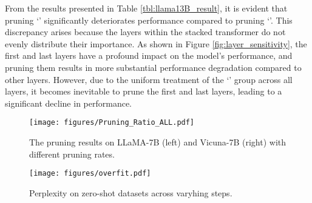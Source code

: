 From the results presented in Table \ref{tbl:llama13B_result}, it is evident that pruning `\channelname' significantly deteriorates performance compared to pruning `\blockname'. This discrepancy arises because the layers within the stacked transformer do not evenly distribute their importance. As shown in Figure \ref{fig:layer_sensitivity}, the first and last layers have a profound impact on the model's performance, and pruning them results in more substantial performance degradation compared to other layers. However, due to the uniform treatment of the `\channelname' group across all layers, it becomes inevitable to prune the first and last layers, leading to a significant decline in performance.

\begin{table}[t]
    \centering
    \caption{Zero-shot Performance of the compressed ChatGLM-6B} \label{tbl:chatglm_result}
\end{table}

\begin{figure}[t]
  \centering
  \vspace{-1mm}
  \begin{minipage}[b]{0.63\linewidth}
    \centering
    \texttt{[image: figures/Pruning\_Ratio\_ALL.pdf]}
    \caption{The pruning results on LLaMA-7B (left) and Vicuna-7B (right) with different pruning rates.}
    \label{fig:pruning_ratio}
  \end{minipage}
  \hfill
  \begin{minipage}[b]{0.35\linewidth}
    \centering
    \texttt{[image: figures/overfit.pdf]}
    \caption{Perplexity on zero-shot datasets across varyhing steps.}
    \label{fig:tune_overfit}
  \end{minipage}
  \vspace{-3mm}
\end{figure}

